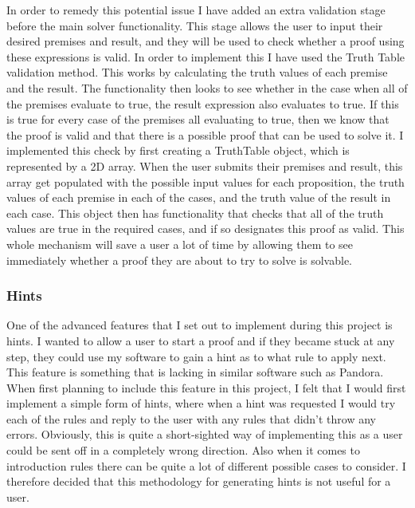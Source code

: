 In order to remedy this potential issue I have added an extra validation stage before the main solver functionality. This stage allows the user to input their desired premises and result, and they will be used to check whether a proof using these expressions is valid. In order to implement this I have used the Truth Table validation method. This works by calculating the truth values of each premise and the result. The functionality then looks to see whether in the case when all of the premises evaluate to true, the result expression also evaluates to true. If this is true for every case of the premises all evaluating to true, then we know that the proof is valid and that there is a possible proof that can be used to solve it. I implemented this check by first creating a TruthTable object, which is represented by a 2D array. When the user submits their premises and result, this array get populated with the possible input values for each proposition, the truth values of each premise in each of the cases, and the truth value of the result in each case. This object then has functionality that checks that all of the truth values are true in the required cases, and if so designates this proof as valid. This whole mechanism will save a user a lot of time by allowing them to see immediately whether a proof they are about to try to solve is solvable.

\subsubsection{Hints}

One of the advanced features that I set out to implement during this project is hints. I wanted to allow a user to start a proof and if they became stuck at any step, they could use my software to gain a hint as to what rule to apply next. This feature is something that is lacking in similar software such as Pandora. When first planning to include this feature in this project,  I felt that I would first implement a simple form of hints, where when a hint was requested I would try each of the rules and reply to the user with any rules that didn't throw any errors. Obviously, this is quite a short-sighted way of implementing this as a user could be sent off in a completely wrong direction. Also when it comes to introduction rules there can be quite a lot of different possible cases to consider. I therefore decided that this methodology for generating hints is not useful for a user.


